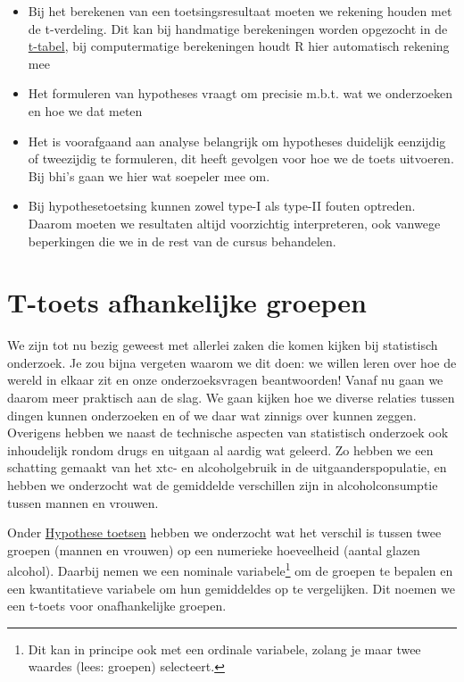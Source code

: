 \documentclass[
  letterpaper,
  DIV=11,
  numbers=noendperiod]{scrreprt}
\begin{document}
\begin{itemize}
\item
  Bij het berekenen van een toetsingsresultaat moeten we rekening houden
  met de t-verdeling. Dit kan bij handmatige berekeningen worden
  opgezocht in de
  \href{https://statisticsfundamentals.com/tables/t-distribution-table/}{t-tabel},
  bij computermatige berekeningen houdt R hier automatisch rekening mee
\item
  Het formuleren van hypotheses vraagt om precisie m.b.t. wat we
  onderzoeken en hoe we dat meten
\item
  Het is voorafgaand aan analyse belangrijk om hypotheses duidelijk
  eenzijdig of tweezijdig te formuleren, dit heeft gevolgen voor hoe we
  de toets uitvoeren. Bij bhi's gaan we hier wat soepeler mee om.
\item
  Bij hypothesetoetsing kunnen zowel type-I als type-II fouten optreden.
  Daarom moeten we resultaten altijd voorzichtig interpreteren, ook
  vanwege beperkingen die we in de rest van de cursus behandelen.
\end{itemize}

\chapter{T-toets afhankelijke
groepen}\label{t-toets-afhankelijke-groepen}

We zijn tot nu bezig geweest met allerlei zaken die komen kijken bij
statistisch onderzoek. Je zou bijna vergeten waarom we dit doen: we
willen leren over hoe de wereld in elkaar zit en onze onderzoeksvragen
beantwoorden! Vanaf nu gaan we daarom meer praktisch aan de slag. We
gaan kijken hoe we diverse relaties tussen dingen kunnen onderzoeken en
of we daar wat zinnigs over kunnen zeggen. Overigens hebben we naast de
technische aspecten van statistisch onderzoek ook inhoudelijk rondom
drugs en uitgaan al aardig wat geleerd. Zo hebben we een schatting
gemaakt van het xtc- en alcoholgebruik in de uitgaanderspopulatie, en
hebben we onderzocht wat de gemiddelde verschillen zijn in
alcoholconsumptie tussen mannen en vrouwen.

Onder \hyperref[hypothesetoetsing]{Hypothese toetsen} hebben we
onderzocht wat het verschil is tussen twee groepen (mannen en vrouwen)
op een numerieke hoeveelheid (aantal glazen alcohol). Daarbij nemen we
een nominale variabele\footnote{Dit kan in principe ook met een ordinale
  variabele, zolang je maar twee waardes (lees: groepen) selecteert.} om
de groepen te bepalen en een kwantitatieve variabele om hun gemiddeldes
op te vergelijken. Dit noemen we een t-toets voor onafhankelijke
groepen.
\end{document}
